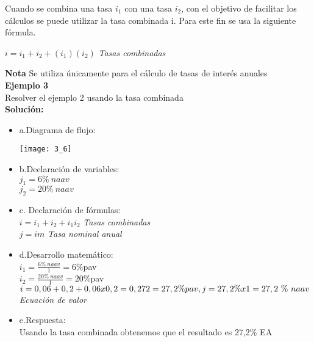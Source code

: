 Cuando se combina una tasa $i_{1}$ con una tasa $i_{2}$, con el objetivo de facilitar los cálculos se puede utilizar la tasa combinada i. Para este fin se usa la siguiente fórmula.\\
\centerline{$ i = i_{1} +i_{2} + (i_{1})( i_{2})$ \hspace{15}\textit{ Tasas combinadas}\\}
\textbf{Nota} Se utiliza únicamente para el cálculo de tasas de interés anuales\\




\textbf{Ejemplo 3}\\
Resolver el ejemplo 2 usando la tasa combinada\\

\textbf{Solución:}\\

\begin{itemize}
	\item a.Diagrama de flujo:\\
	
	\begin{center}
		\texttt{[image: 3\_6]}
	\end{center}
	
	
	\item b.Declaración de variables:\\
	$j_{1} = 6\%\ naav$\\
	$j_{2} = 20\%\  naav$\\
	\item c. Declaración de fórmulas:\\
	$i =i_{1} + i_{2} + i_{1}  i_{2}$\hspace{35}\textit{ Tasas combinadas}\\
	$j =i  m$\hspace{35}\textit{ Tasa nominal anual}\\
	\item d.Desarrollo matemático:\\
	$i_{1}= \frac{6 \%\ naav}{1} = 6\% $pav \\
	$i_{2}= \frac{20 \%\ naav}{1} = 20\% $pav \\
	$i= 0,06 + 0,2 + 0,06 x 0,2 = 0,272 = 27,2\% pav,\\ j = 27,2\% x1 = 27,2\ \%\ naav$ \hspace{35}\textit{ Ecuación de valor}\\
	\item e.Respuesta:\\
	Usando la tasa combinada obtenemos que el resultado es 27,2\% EA\\
	
\end{itemize}


